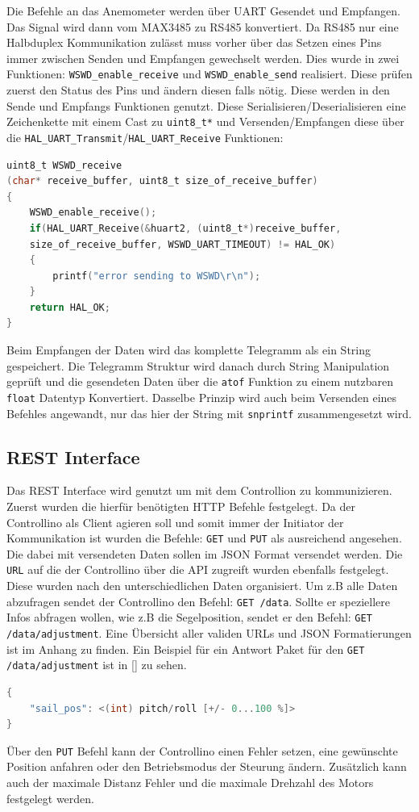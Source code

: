 \noindent Die Befehle an das Anemometer werden über \ac{UART} Gesendet und Empfangen. Das Signal wird dann vom MAX3485 zu RS485 konvertiert. Da RS485 nur eine Halbduplex Kommunikation zulässt muss vorher über das Setzen eines Pins immer zwischen Senden und Empfangen gewechselt werden. Dies wurde in zwei Funktionen: \verb|WSWD_enable_receive| und \verb|WSWD_enable_send| realisiert. Diese prüfen zuerst den Status des Pins und ändern diesen falls nötig. Diese werden in den Sende und Empfangs Funktionen genutzt. Diese Serialisieren/Deserialisieren eine Zeichenkette mit einem Cast zu \verb|uint8_t*| und Versenden/Empfangen diese über die \verb|HAL_UART_Transmit|/\verb|HAL_UART_Receive| Funktionen:
\begin{lstlisting}[language=C, caption={Empfangen einer Nachricht vom WSWD}, label={lst:WSWDreceive}]
uint8_t WSWD_receive
(char* receive_buffer, uint8_t size_of_receive_buffer)
{
	WSWD_enable_receive();
	if(HAL_UART_Receive(&huart2, (uint8_t*)receive_buffer, 
	size_of_receive_buffer, WSWD_UART_TIMEOUT) != HAL_OK)
	{
		printf("error sending to WSWD\r\n");
	}
	return HAL_OK;
}
\end{lstlisting}
Beim Empfangen der Daten wird das komplette Telegramm als ein String gespeichert. Die Telegramm Struktur wird danach durch String Manipulation geprüft und die gesendeten Daten über die \verb|atof| Funktion zu einem nutzbaren \verb|float| Datentyp Konvertiert. Dasselbe Prinzip wird auch beim Versenden eines Befehles angewandt, nur das hier der String mit \verb|snprintf| zusammengesetzt wird.\\
\subsection{\ac{REST} Interface}
Das \ac{REST} Interface wird genutzt um mit dem Controllion zu kommunizieren. Zuerst wurden die hierfür benötigten \ac{HTTP} Befehle festgelegt. Da der Controllino als Client agieren soll und somit immer der Initiator der Kommunikation ist wurden die Befehle: \verb|GET| und \verb|PUT| als ausreichend angesehen. Die dabei mit versendeten Daten sollen im \ac{JSON} Format versendet werden. Die \verb|URL| auf die der Controllino über die \ac{API} zugreift wurden ebenfalls festgelegt. Diese wurden nach den unterschiedlichen Daten organisiert. Um z.B alle Daten abzufragen sendet der Controllino den Befehl: \verb|GET /data|. Sollte er speziellere Infos abfragen wollen, wie z.B die Segelposition, sendet er den Befehl: \verb|GET /data/adjustment|. Eine Übersicht aller validen \ac{URL}s und JSON Formatierungen ist im Anhang zu finden. Ein Beispiel für ein Antwort Paket für den \verb|GET /data/adjustment| ist in \autoref{} zu sehen.
\begin{lstlisting}[language=C, caption={GET /data/adjustment Antwort Paket}, label={lst:JSONantwort}]
{
	"sail_pos": <(int) pitch/roll [+/- 0...100 %]>
}
\end{lstlisting}
Über den \verb|PUT| Befehl kann der Controllino einen Fehler setzen, eine gewünschte Position anfahren oder den Betriebsmodus der Steurung ändern. Zusätzlich kann auch der maximale Distanz Fehler und die maximale Drehzahl des Motors festgelegt werden.\\

